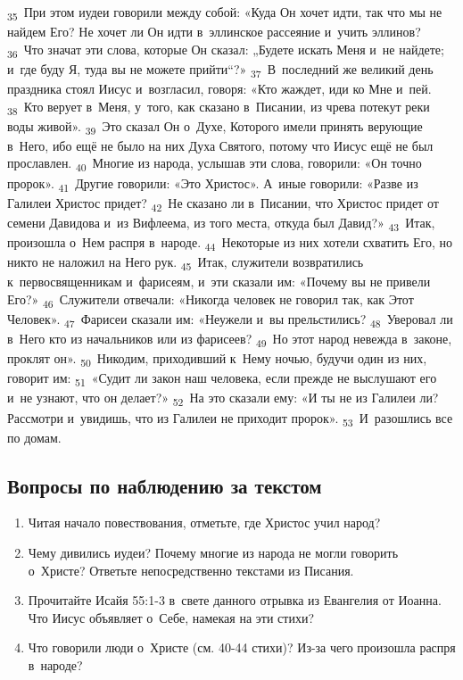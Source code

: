 \documentclass[a4paper,12pt]{article}
\begin{document}
\textsubscript{35}~При этом иудеи говорили между собой: «Куда Он хочет идти, так что мы не найдем Его? Не хочет ли Он идти в~эллинское рассеяние и~учить эллинов?
\textsubscript{36}~Что значат эти слова, которые Он сказал: „Будете искать Меня и~не найдете; и~где буду Я, туда вы не можете прийти“?»
\textsubscript{37}~В~последний же великий день праздника стоял Иисус и~возгласил, говоря: «Кто жаждет, иди ко Мне и~пей.
\textsubscript{38}~Кто верует в~Меня, у~того, как сказано в~Писании, из чрева потекут реки воды живой».
\textsubscript{39}~Это сказал Он о~Духе, Которого имели принять верующие в~Него, ибо ещё не было на них Духа Святого, потому что Иисус ещё не был прославлен.
\textsubscript{40}~Многие из народа, услышав эти слова, говорили: «Он точно пророк».
\textsubscript{41}~Другие говорили: «Это Христос». А~иные говорили: «Разве из Галилеи Христос придет?
\textsubscript{42}~Не сказано ли в~Писании, что Христос придет от семени Давидова и~из Вифлеема, из того места, откуда был Давид?»
\textsubscript{43}~Итак, произошла о~Нем распря в~народе.
\textsubscript{44}~Некоторые из них хотели схватить Его, но никто не наложил на Него рук.
\textsubscript{45}~Итак, служители возвратились к~первосвященникам и~фарисеям, и~эти сказали им: «Почему вы не привели Его?»
\textsubscript{46}~Служители отвечали: «Никогда человек не говорил так, как Этот Человек».
\textsubscript{47}~Фарисеи сказали им: «Неужели и~вы прельстились?
\textsubscript{48}~Уверовал ли в~Него кто из начальников или из фарисеев?
\textsubscript{49}~Но этот народ невежда в~законе, проклят он».
\textsubscript{50}~Никодим, приходивший к~Нему ночью, будучи один из них, говорит им:
\textsubscript{51}~«Судит ли закон наш человека, если прежде не выслушают его и~не узнают, что он делает?»
\textsubscript{52}~На это сказали ему: «И ты не из Галилеи ли? Рассмотри и~увидишь, что из Галилеи не приходит пророк».
\textsubscript{53}~И~разошлись все по домам. 

\subsection*{Вопросы по наблюдению за текстом}
\begin{enumerate}
    \item Читая начало повествования, отметьте, где Христос учил народ? 
    
    \myline
    
    \item Чему дивились иудеи? Почему многие из народа не могли говорить о~Христе? Ответьте непосредственно текстами из Писания. 
    
    \myline
    
    \myline
    \item Прочитайте Исайя 55:1-3 в~свете данного отрывка из Евангелия от Иоанна. Что Иисус объявляет о~Себе, намекая на эти стихи? 
    
    \myline
    
    \myline
    \item Что говорили люди о~Христе (см. 40-44 стихи)? Из-за чего произошла распря в~народе? 
    
    \myline
    
    \myline
\end{enumerate}
\end{document}
